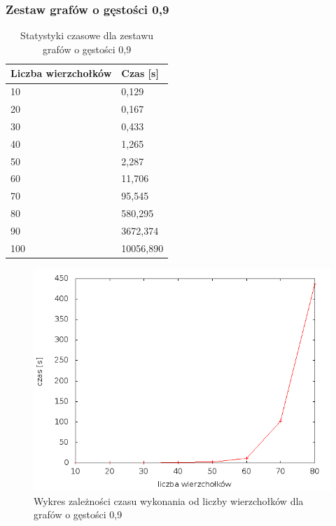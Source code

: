 \documentclass[12pt, a4paper]{article}
\begin{document}
\subsubsection*{Zestaw grafów o gęstości 0,9}
\begin{table}[H]
\caption{Statystyki czasowe dla zestawu grafów o gęstości 0,9}
\begin{center}
    \begin{tabular}{|l|l|}
    \hline
    Liczba wierzchołków & Czas [s] \\ \hline
    10 & 0,129 \\ \hline
    20 & 0,167 \\ \hline
    30 & 0,433 \\ \hline
    40 & 1,265 \\ \hline
    50 & 2,287 \\ \hline
    60 & 11,706 \\ \hline
    70 & 95,545 \\ \hline
    80 & 580,295 \\ \hline
    90 & 3672,374 \\ \hline
    100 & 10056,890 \\ \hline
    \end{tabular}
\end{center}
\end{table}

\begin{figure}[h]
    \begin{center}
	\includegraphics[scale=0.5]{results/img/den/den_09.png}
	\caption{Wykres zależności czasu wykonania od liczby wierzchołków dla grafów o gęstości 0,9}
    \end{center}
\end{figure}
\end{document}
